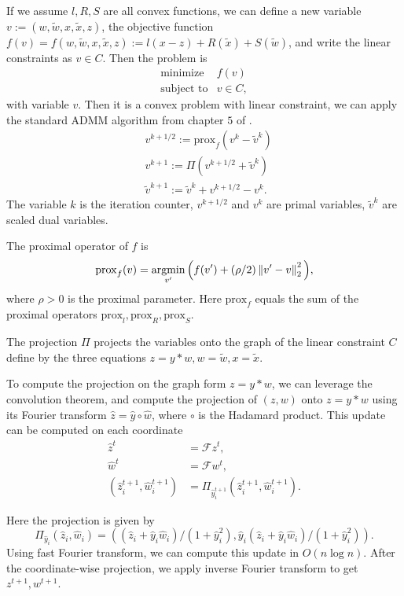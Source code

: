 \documentclass[12pt]{article}
\begin{document}
If we assume $l,R,S$ are all convex functions, we can define a new variable $v := (w, \tilde{w},x, \tilde{x}, z)$, 
the objective function $f(v) = f(w, \tilde{w},x, \tilde{x}, z):=l(x-z)+R(\tilde{x})+ S(\tilde{w})$, and write the linear constraints as $v\in C$. 
Then the problem is
\[
\begin{array}{ll}
\mbox{minimize}   & f(v) \\
\mbox{subject to} & v\in C,
\end{array}
\]
with variable $v$.
Then it is a convex problem with linear constraint, we can apply the standard ADMM algorithm from chapter $5$ of \cite{boyd2011distributed}. 
\[
\begin{array}{ll}
&v^{k+1/2} := \mathrm{prox}_{f}(v^{k}-\tilde{v}^{k})\\
&v^{k+1} :=  \Pi\left(v^{k+1/2}+\tilde{v}^k\right)\\
&\tilde{v}^{k+1} :=  \tilde{v}^k + v^{k+1/2} - v^k.
\end{array}
\]
The variable $k$ is the iteration counter, $v^{k+1/2}$ and $v^{k}$  are primal
variables, $\tilde{v}^k$ are scaled dual variables.

The proximal operator of $f$ is
\[
	\mathrm{prox}_{f}(v) = \mathop{\rm argmin}_{v'}\Big(f(v') + (\rho/2) \left\|v' - v\right\|_2^2\Big),
\]
where $\rho>0$ is the proximal parameter. Here $\mathrm{prox}_{f}$ equals the sum of the proximal operators $\mathrm{prox}_{l},\mathrm{prox}_{R},\mathrm{prox}_{S}$.

The projection $\Pi$ projects the variables onto the graph of the linear constraint $C$ define by the three equations $z = y*w, w = \tilde{w}, x = \tilde{x}$. 

To compute the projection on the graph form  $z = y*w$, we can leverage the convolution theorem, 
and compute the projection of $(z,w)$ onto $z = y*w$ using its Fourier transform  $\hat z =\hat y  \circ \hat w$, where $ \circ$ is the Hadamard product.  
This update can be computed on each coordinate
\[
\begin{array}{ll}
    \hat z^{t} &= \mathcal{F}  z^{t},\\
    \hat w^{t} &= \mathcal{F}  w^{t}, \\
 (\hat z^{t+1}_i, \hat w^{t+1}_i) &= \Pi_{\hat y^{t+1}_i}(\hat z^{t+1}_i, \hat w^{t+1}_i).
\end{array}
\]
  
Here the projection is given by
\[
 \Pi_{\hat y_i}(\hat z_i, \hat w_i)= ((\hat z_i+ \hat y_i \hat w_i)/(1+\hat y_i^2), \hat y_i(\hat z_i+ \hat y_i \hat w_i)/(1+\hat y_i^2)).
\]
 Using fast Fourier transform, we can compute this update in $O(n\log n)$.
 After the coordinate-wise projection, we apply inverse Fourier transform to get 
 $z^{t+1}, w^{t+1}$.
\end{document}
